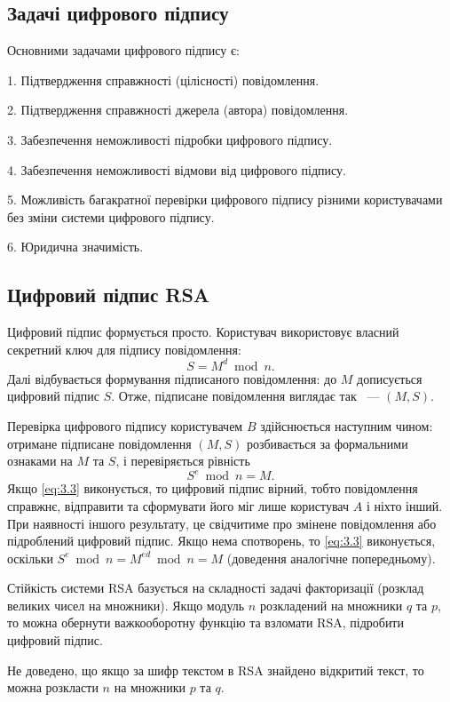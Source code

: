 \subsection{Задачі цифрового підпису}

Основними задачами цифрового підпису є:

\par1. Підтвердження справжності (цілісності) повідомлення.
\par2. Підтвердження справжності джерела (автора) повідомлення.
\par3. Забезпечення неможливості підробки цифрового підпису.
\par4. Забезпечення неможливості відмови від цифрового підпису.
\par5. Можливість багакратної перевірки цифрового підпису різними користувачами без зміни системи цифрового підпису. 
\par6. Юридична значимість.

\subsection{Цифровий підпис RSA}
Цифровий підпис формується просто. Користувач використовує власний секретний ключ для підпису повідомлення:
\begin{equation}
S = M ^d \bmod n.
\end{equation}
Далі відбувається формування підписаного повідомлення: до $M$ дописується цифровий підпис $S$. Отже, підписане повідомлення виглядає так ~--- $(M, S)$.

Перевірка цифрового підпису користувачем $B$ здійснюється наступним чином: отримане підписане повідомлення $(M, S)$ розбивається за формальними ознаками на $M$ та $S$, і перевіряється рівність 
\begin{equation} \label{eq:3.3} 
S ^ e \bmod n = M.
\end{equation}
Якщо \eqref{eq:3.3} виконується, то цифровий підпис вірний, тобто повідомлення справжнє, відправити та сформувати його міг лише користувач $A$ і ніхто інший. При наявності іншого результату, це свідчитиме про змінене повідомлення або підроблений цифровий підпис.
Якщо нема спотворень, то \eqref{eq:3.3} виконується, оскільки $S ^ e \bmod n = M ^ {ed} \bmod n = M$ (доведення аналогічне попередньому).

Стійкість системи RSA базується на складності задачі факторизації (розклад великих чисел на множники). Якщо модуль $n$ розкладений на множники $q$ та $p$, то можна обернути важкооборотну функцію та взломати RSA, підробити цифровий підпис.

Не доведено, що якщо за шифр текстом в RSA знайдено відкритий текст, то можна розкласти $n$ на множники $p$ та $q$.
